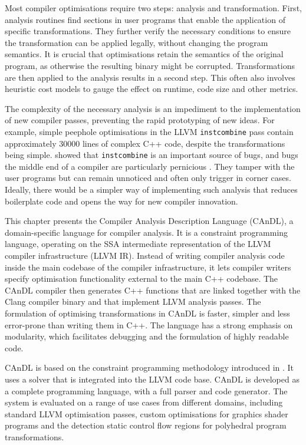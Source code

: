     Most compiler optimisations require two steps:
    analysis and transformation.
    First, analysis routines find sections in user programs that enable the
    application of specific transformations.
    They further verify the necessary conditions to ensure the transformation
    can be applied legally, without changing the program semantics.
    It is crucial that optimisations retain the semantics of the original
    program, as otherwise the resulting binary might be corrupted.
    Transformations are then applied to the analysis results in a second step.
    This often also involves heuristic cost models to gauge the effect on
    runtime, code size and other metrics.

    The complexity of the necessary analysis is an impediment to
    the implementation of new compiler passes, preventing the rapid
    prototyping of new ideas.
    For example, simple peephole optimisations in the LLVM {\tt instcombine}
    pass contain approximately 30000 lines of complex C++ code, despite the
    transformations being simple.
    \citet{Menendez:2017:ADP:3062341.3062372} showed that {\tt instcombine} is
    an important source of bugs, and bugs the middle end of a compiler are
    particularly pernicious \citep{Yang:2011:FUB:1993316.1993532}.
    They tamper with the user programs but can remain unnoticed and often only
    trigger in corner cases.
    Ideally, there would be a simpler way of implementing such analysis that
    reduces boilerplate code and opens the way for new compiler innovation.

    This chapter presents the Compiler Analysis Description Language (CAnDL), a
    domain-specific language for compiler analysis.
    It is a constraint programming language, operating on the SSA intermediate
    representation of the LLVM compiler infrastructure (LLVM IR).
    Instead of writing compiler analysis code inside the main codebase of the
    compiler infrastructure, it lets compiler writers specify optimisation
    functionality external to the main C++ codebase.
    The CAnDL compiler then generates C++ functions that are linked together
    with the Clang compiler binary and that implement LLVM analysis passes.
    The formulation of optimising transformations in CAnDL is faster, simpler
    and less error-prone than writing them in C++.
    The language has a strong emphasis on modularity, which facilitates
    debugging and the formulation of highly readable code.

    CAnDL is based on the constraint programming methodology introduced in
    .
    It uses a solver that is integrated into the LLVM code base.
    CAnDL is developed as a complete programming language, with a full parser
    and code generator.
    The system is evaluated on a range of use cases from
    different domains, including standard LLVM optimisation passes,
    custom optimisations for graphics shader programs and the detection static
    control flow regions for polyhedral program transformations.

